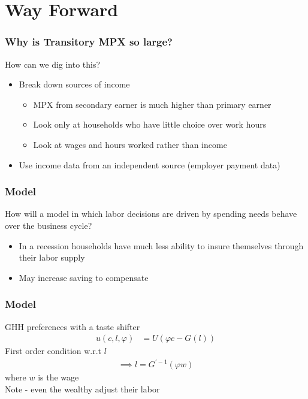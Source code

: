 \documentclass{beamer}
\begin{document}
\section{Way Forward}
\frame
{
	\frametitle{Why is Transitory MPX so large?}
	How can we dig into this?\\
	\bigskip
	\begin{itemize}
		\item Break down sources of income
		\begin{itemize}
			\item MPX from secondary earner is much higher than primary earner
			\item Look only at households who have little choice over work hours
			\item Look at wages and hours worked rather than income
		\end{itemize}	
		\item Use income data from an independent source (employer payment data)
	\end{itemize}
}
\frame
{
	\frametitle{Model}
	How will a model in which labor decisions are driven by spending needs behave over the business cycle?\\
	\begin{itemize}
		\item In a recession households have much less ability to insure themselves through their labor supply
		\item May increase saving to compensate
	\end{itemize}
}
\frame
{
	\frametitle{Model}
	GHH preferences with a taste shifter
	\begin{align*}
	u(c,l,\varphi) &= U(\varphi c - G(l))
	\end{align*}
	First order condition w.r.t $l$
	\begin{align*}
	\implies l = G^{'-1}(\varphi w)
	\end{align*}
	where $w$ is the wage\\
	\bigskip
	Note - even the wealthy adjust their labor
}
\end{document}
